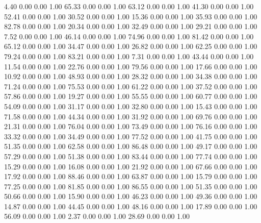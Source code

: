     4.40   0.00   0.00   1.00
   65.33   0.00   0.00   1.00
   63.12   0.00   0.00   1.00
   41.30   0.00   0.00   1.00
   52.41   0.00   0.00   1.00
   30.52   0.00   0.00   1.00
   15.36   0.00   0.00   1.00
   35.93   0.00   0.00   1.00
   82.78   0.00   0.00   1.00
   20.34   0.00   0.00   1.00
   32.49   0.00   0.00   1.00
   29.21   0.00   0.00   1.00
    7.52   0.00   0.00   1.00
   46.14   0.00   0.00   1.00
   74.96   0.00   0.00   1.00
   81.42   0.00   0.00   1.00
   65.12   0.00   0.00   1.00
   34.47   0.00   0.00   1.00
   26.82   0.00   0.00   1.00
   62.25   0.00   0.00   1.00
   79.24   0.00   0.00   1.00
   83.21   0.00   0.00   1.00
    7.31   0.00   0.00   1.00
   43.44   0.00   0.00   1.00
   11.54   0.00   0.00   1.00
   22.76   0.00   0.00   1.00
   79.56   0.00   0.00   1.00
   17.66   0.00   0.00   1.00
   10.92   0.00   0.00   1.00
   48.93   0.00   0.00   1.00
   28.32   0.00   0.00   1.00
   34.38   0.00   0.00   1.00
   71.24   0.00   0.00   1.00
   75.53   0.00   0.00   1.00
   61.22   0.00   0.00   1.00
   37.52   0.00   0.00   1.00
   57.86   0.00   0.00   1.00
   19.27   0.00   0.00   1.00
   55.55   0.00   0.00   1.00
   60.77   0.00   0.00   1.00
   54.09   0.00   0.00   1.00
   31.17   0.00   0.00   1.00
   32.80   0.00   0.00   1.00
   15.43   0.00   0.00   1.00
   71.58   0.00   0.00   1.00
   44.34   0.00   0.00   1.00
   31.92   0.00   0.00   1.00
   69.76   0.00   0.00   1.00
   21.31   0.00   0.00   1.00
   76.04   0.00   0.00   1.00
   73.49   0.00   0.00   1.00
   76.16   0.00   0.00   1.00
   33.32   0.00   0.00   1.00
   34.49   0.00   0.00   1.00
   77.52   0.00   0.00   1.00
   41.75   0.00   0.00   1.00
   51.35   0.00   0.00   1.00
   62.58   0.00   0.00   1.00
   86.48   0.00   0.00   1.00
   49.17   0.00   0.00   1.00
   57.29   0.00   0.00   1.00
   51.38   0.00   0.00   1.00
   83.44   0.00   0.00   1.00
   77.74   0.00   0.00   1.00
   15.29   0.00   0.00   1.00
   16.08   0.00   0.00   1.00
   21.92   0.00   0.00   1.00
   67.66   0.00   0.00   1.00
   17.92   0.00   0.00   1.00
   88.46   0.00   0.00   1.00
   63.87   0.00   0.00   1.00
   15.79   0.00   0.00   1.00
   77.25   0.00   0.00   1.00
   81.85   0.00   0.00   1.00
   86.55   0.00   0.00   1.00
   51.35   0.00   0.00   1.00
   50.66   0.00   0.00   1.00
   15.90   0.00   0.00   1.00
   46.23   0.00   0.00   1.00
   49.36   0.00   0.00   1.00
   14.87   0.00   0.00   1.00
   44.45   0.00   0.00   1.00
   48.16   0.00   0.00   1.00
   17.89   0.00   0.00   1.00
   56.09   0.00   0.00   1.00
    2.37   0.00   0.00   1.00
   28.69   0.00   0.00   1.00
